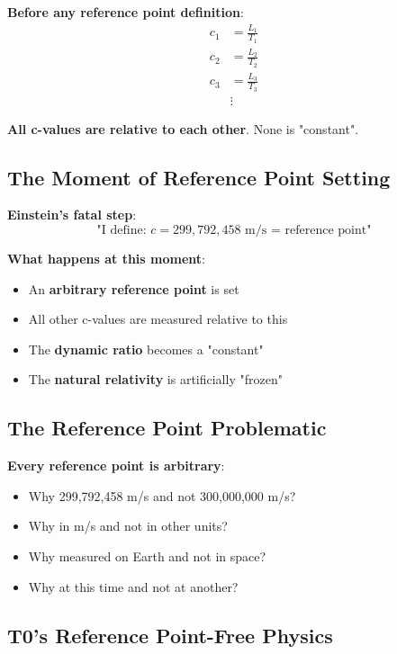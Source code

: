 \documentclass[12pt,a4paper]{article}
\begin{document}
	\textbf{Before any reference point definition}:
	\begin{align}
		c_1 &= \frac{L_1}{T_1} \\
		c_2 &= \frac{L_2}{T_2} \\
		c_3 &= \frac{L_3}{T_3} \\
		&\vdots
	\end{align}
	
	\textbf{All c-values are relative to each other}. None is "constant".
	
	\subsection{The Moment of Reference Point Setting}
	
	\textbf{Einstein's fatal step}:
	\begin{equation}
		\text{"I define: } c = 299,792,458 \text{ m/s = reference point"}
	\end{equation}
	
	\textbf{What happens at this moment}:
	\begin{itemize}
		\item An \textbf{arbitrary reference point} is set
		\item All other c-values are measured relative to this
		\item The \textbf{dynamic ratio} becomes a "constant"
		\item The \textbf{natural relativity} is artificially "frozen"
	\end{itemize}
	
	\subsection{The Reference Point Problematic}
	
	\textbf{Every reference point is arbitrary}:
	\begin{itemize}
		\item Why 299,792,458 m/s and not 300,000,000 m/s?
		\item Why in m/s and not in other units?
		\item Why measured on Earth and not in space?
		\item Why at this time and not at another?
	\end{itemize}
	
	\subsection{T0's Reference Point-Free Physics}
	
\end{document}
